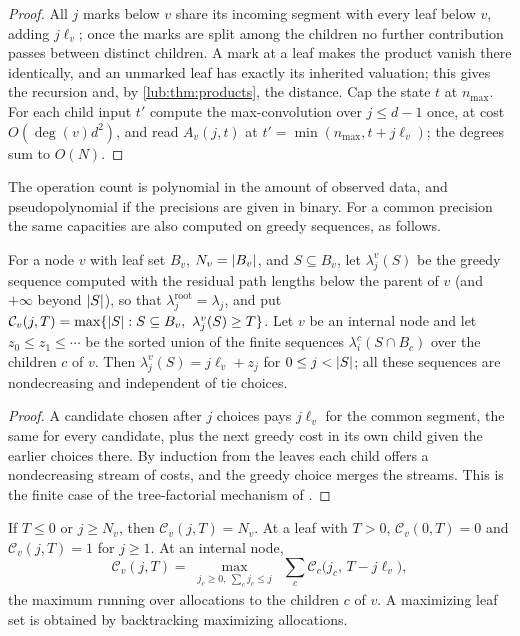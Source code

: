\begin{proof}
All $j$ marks below $v$ share its incoming segment with every leaf below $v$, adding $j\ell_v$; once
the marks are split among the children no further contribution passes between distinct children. A
mark at a leaf makes the product vanish there identically, and an unmarked leaf has exactly its
inherited valuation; this gives the recursion and, by \cref{lub:thm:products}, the distance. Cap the
state $t$ at $n_{\max}$. For each child input $t'$ compute the max-convolution over $j\le d-1$ once, at
cost $O(\deg(v)d^2)$, and read $A_v(j,t)$ at $t'=\min(n_{\max},t+j\ell_v)$; the degrees sum to $O(N)$.
\end{proof}

The operation count is polynomial in the amount of observed data, and pseudopolynomial if the
precisions are given in binary. For a common precision the same capacities are also computed on
greedy sequences, as follows.

\begin{lemma}\label{lub:lem:merge}
For a node $v$ with leaf set $B_v$, $N_v=\lvert B_v\rvert$, and $S\subseteq B_v$, let $\lambda_j^v(S)$ be the
greedy sequence computed with the residual path lengths below the parent of $v$ (and
$+\infty$ beyond $\lvert S\rvert$), so that $\lambda_j^{\mathrm{root}}=\lambda_j$, and put
$\mathcal C_v(j,T)=\max\{\lvert S\rvert:S\subseteq B_v,\ \lambda_j^v(S)\ge T\}$.
Let $v$ be an internal node and let $z_0\le z_1\le\cdots$ be the sorted union of the finite
sequences $\lambda_i^c(S\cap B_c)$ over the children $c$ of $v$. Then
$\lambda_j^v(S)=j\ell_v+z_j$ for $0\le j<\lvert S\rvert$; all these sequences are nondecreasing and
independent of tie choices.
\end{lemma}

\begin{proof}
A candidate chosen after $j$ choices pays $j\ell_v$ for the common segment, the same for
every candidate, plus the next greedy cost in its own child given the earlier choices there.
By induction from the leaves each child offers a nondecreasing stream of costs, and the
greedy choice merges the streams. This is the finite case of the tree-factorial mechanism of
\cite[Theorem~2.7]{Amini2016Logarithmic}.
\end{proof}

\begin{theorem}\label{lub:thm:dp}
If $T\le0$ or $j\ge N_v$, then $\mathcal C_v(j,T)=N_v$. At a leaf with $T>0$,
$\mathcal C_v(0,T)=0$ and $\mathcal C_v(j,T)=1$ for $j\ge1$. At an internal node,
\begin{equation}\label{lub:eq:dp}
 \mathcal C_v(j,T)=\max_{\substack{j_c\ge0,\ \sum_cj_c\le j}}\ \sum_c\mathcal C_c\bigl(j_c,\,T-j\ell_v\bigr),
\end{equation}
the maximum running over allocations to the children $c$ of $v$. A maximizing leaf set is
obtained by backtracking maximizing allocations.
\end{theorem}

